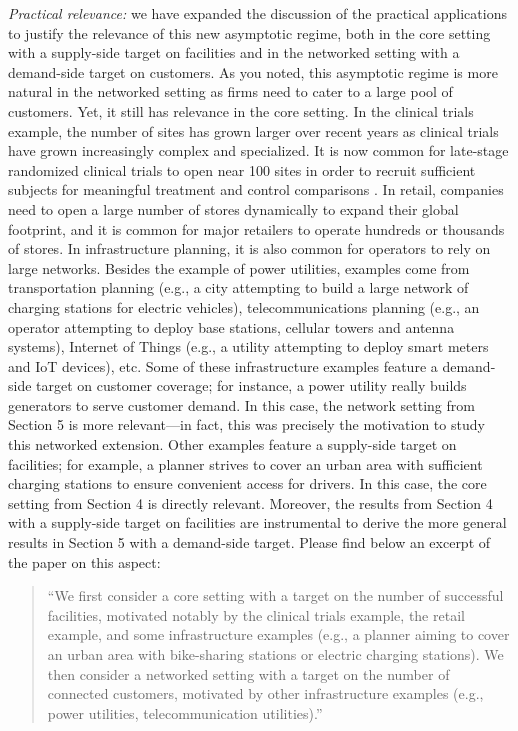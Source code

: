 \documentclass[11pt]{article}
\begin{document}
\textit{Practical relevance:} we have expanded the discussion of the practical applications to justify the relevance of this new asymptotic regime, both in the core setting with a supply-side target on facilities and in the networked setting with a demand-side target on customers. As you noted, this asymptotic regime is more natural in the networked setting as firms need to cater to a large pool of customers. Yet, it still has relevance in the core setting. In the clinical trials example, the number of sites has grown larger over recent years as clinical trials have grown increasingly complex and specialized. It is now common for late-stage randomized clinical trials to open near 100 sites in order to recruit sufficient subjects for meaningful treatment and control comparisons \citep{brogger2022changes}. In retail, companies need to open a large number of stores dynamically to expand their global footprint, and it is common for major retailers to operate hundreds or thousands of stores. In infrastructure planning, it is also common for operators to rely on large networks. Besides the example of power utilities, examples come from transportation planning (e.g., a city attempting to build a large network of charging stations for electric vehicles), telecommunications planning (e.g., an operator attempting to deploy base stations, cellular towers and antenna systems), Internet of Things (e.g., a utility attempting to deploy smart meters and IoT devices), etc. Some of these infrastructure examples feature a demand-side target on customer coverage; for instance, a power utility really builds generators to serve customer demand. In this case, the network setting from Section 5 is more relevant---in fact, this was precisely the motivation to study this networked extension. Other examples feature a supply-side target on facilities; for example, a planner strives to cover an urban area with sufficient charging stations to ensure convenient access for drivers. In this case, the core setting from Section 4 is directly relevant. Moreover, the results from Section 4 with a supply-side target on facilities are instrumental to derive the more general results in Section 5 with a demand-side target. Please find below an excerpt of the paper on this aspect:
\begin{quote}
    ``We first consider a core setting with a target on the number of successful facilities, motivated notably by the clinical trials example, the retail example, and some infrastructure examples (e.g., a planner aiming to cover an urban area with bike-sharing stations or electric charging stations). We then consider a networked setting with a target on the number of connected customers, motivated by other infrastructure examples (e.g., power utilities, telecommunication utilities).''
\end{quote}
\end{document}
